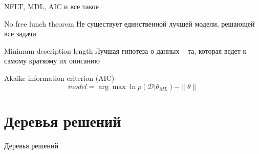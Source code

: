 \documentclass[10pt]{beamer}
\begin{document}
\begin{frame}{NFLT, MDL, AIC и все такое}

\begin{block}{No free lunch theorem}
Не существует единственной лучшей модели, решающей все задачи
\end{block}

\begin{block}{Minimum description length}
Лучшая гипотеза о данных -- та, которая ведет к самому краткому их описанию
\end{block}
\begin{block}{Akaike information criterion (AIC)}
\[
model = \arg\max	\ln p(\mathcal{D} | \theta_{ML}) - \|\theta\|
\]
\end{block}

\end{frame}

\section{Деревья решений}

\begin{frame}{}

\begin{center}
\Large Деревья решений
\end{center}

\end{frame}
\end{document}
